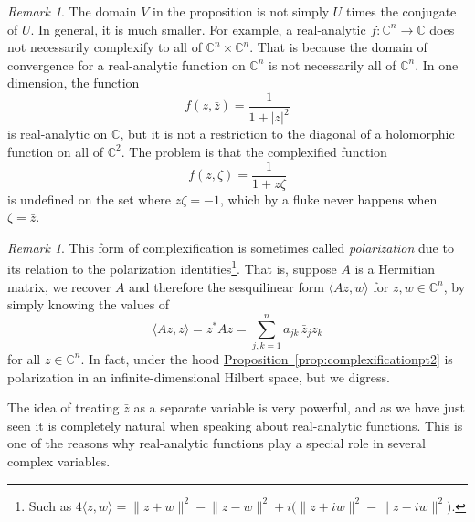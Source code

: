 \documentclass[12pt,openany]{book}
\newcommand{\linnprod}[2]{\langle #1 , #2 \rangle}
\newcommand{\sabs}[1]{\lvert {#1} \rvert}
\newcommand{\snorm}[1]{\lVert {#1} \rVert}
\newcommand{\C}{{\mathbb{C}}}
\newcommand{\myindex}[1]{#1\index{#1}}
\theoremstyle{plain}
\theoremstyle{remark}
\newtheorem{remark}[thm]{Remark}
\theoremstyle{definition}
\theoremstyle{exercise}
\theoremstyle{example}
\newcommand{\propref}[1]{\hyperref[#1]{Proposition~\ref*{#1}}}
\begin{document}
\begin{remark}
The domain $V$ in the proposition is not simply $U$ times the conjugate of $U$.
In general, it is much smaller.  For example, a real-analytic $f \colon \C^n \to
\C$ does not necessarily complexify to all of $\C^n \times \C^n$.  That is
because the domain of convergence for a real-analytic function on $\C^n$
is not necessarily all of $\C^n$.  In one dimension,
the function
\begin{equation*}
f(z,\bar{z})
= \frac{1}{1+\sabs{z}^2}
\end{equation*}
is real-analytic on $\C$, but it is not a restriction to the diagonal
of a holomorphic function on all of $\C^2$.  The problem is that the complexified
function
\begin{equation*}
f(z,\zeta)
= \frac{1}{1+z \zeta}
\end{equation*}
is undefined on the set where $z \zeta = -1$, which by a fluke
never happens when $\zeta = \bar{z}$.
\end{remark}

\begin{remark}
This form of complexification is sometimes called
\emph{\myindex{polarization}} due to its relation to the polarization
identities\footnote{Such as $4 \linnprod{z}{w} =
\snorm{z+w}^2-\snorm{z-w}^2 +i \bigl( \snorm{z+iw}^2 - \snorm{z-iw}^2 \bigr)$.}.  That is, suppose $A$ is a Hermitian matrix, we 
recover $A$ and therefore the sesquilinear form $\linnprod{Az}{w}$ for
$z,w\in \C^n$, by simply knowing the values of
\begin{equation*}
\linnprod{Az}{z} = z^*Az = \sum_{j,k=1}^n a_{jk} \, \bar{z}_j z_k 
\end{equation*}
for all $z \in \C^n$.  In fact, under the hood \propref{prop:complexificationpt2} is
polarization in an infinite-dimensional Hilbert space, but we digress.
\end{remark}

The idea of treating $\bar{z}$ as a separate variable is very powerful, and
as we have just seen it is completely natural when speaking about
real-analytic functions.  This is one of the reasons why real-analytic
functions play a special role in several complex variables.
\end{document}
